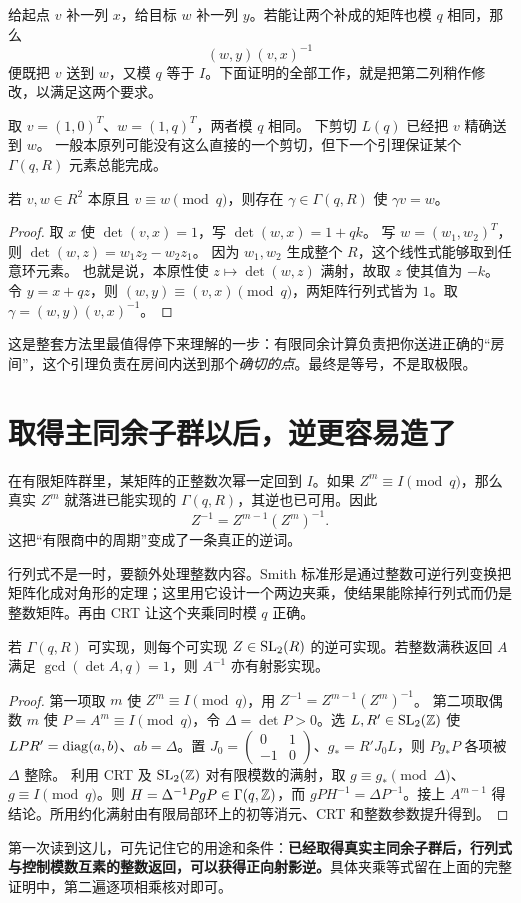 给起点 $v$ 补一列 $x$，给目标 $w$ 补一列 $y$。若能让两个补成的矩阵也模 $q$ 相同，那么
\[(w,y)(v,x)^{-1}
\]
便既把 $v$ 送到 $w$，又模 $q$ 等于 $I$。下面证明的全部工作，就是把第二列稍作修改，以满足这两个要求。
\begin{example}
取 $v=(1,0)^T$、$w=(1,q)^T$，两者模 $q$ 相同。
下剪切 $L(q)$ 已经把 $v$ 精确送到 $w$。
一般本原列可能没有这么直接的一个剪切，但下一个引理保证某个 $\Gamma(q,R)$ 元素总能完成。
\end{example}
\begin{lemma}[相同剩余类中的精确输送]\label{lem:fiber}
若 $v,w\in R^2$ 本原且 $v\equiv w\pmod q$，则存在 $\gamma\in\Gamma(q,R)$ 使 $\gamma v=w$。
\end{lemma}
\begin{proof}
取 $x$ 使 $\det(v,x)=1$，写 $\det(w,x)=1+qk$。
写 $w=(w_1,w_2)^T$，则 $\det(w,z)=w_1z_2-w_2z_1$。
因为 $w_1,w_2$ 生成整个 $R$，这个线性式能够取到任意环元素。
也就是说，本原性使 $z\mapsto\det(w,z)$ 满射，故取 $z$ 使其值为 $-k$。令 $y=x+qz$，则 $(w,y)\equiv(v,x)\pmod q$，两矩阵行列式皆为 $1$。取 $\gamma=(w,y)(v,x)^{-1}$。
\end{proof}
这是整套方法里最值得停下来理解的一步：有限同余计算负责把你送进正确的“房间”，这个引理负责在房间内送到那个\emph{确切的点}。最终是等号，不是取极限。

\section{取得主同余子群以后，逆更容易造了}
在有限矩阵群里，某矩阵的正整数次幂一定回到 $I$。如果 $Z^m\equiv I\pmod q$，那么真实 $Z^m$ 就落进已能实现的 $\Gamma(q,R)$，其逆也已可用。因此
\[Z^{-1}=Z^{m-1}(Z^m)^{-1}.
\]
这把“有限商中的周期”变成了一条真正的逆词。

行列式不是一时，要额外处理整数内容。Smith 标准形是通过整数可逆行列变换把矩阵化成对角形的定理；这里用它设计一个两边夹乘，使结果能除掉行列式而仍是整数矩阵。再由 CRT 让这个夹乘同时模 $q$ 正确。
\begin{lemma}[获得深同余群以后的正向逆]\label{lem:inverse}
若 $\Gamma(q,R)$ 可实现，则每个可实现 $Z\in\operatorname{SL}_2(R)$ 的逆可实现。若整数满秩返回 $A$ 满足 $\gcd(\det A,q)=1$，则 $A^{-1}$ 亦有射影实现。
\end{lemma}
\begin{proof}
第一项取 $m$ 使 $Z^m\equiv I\pmod q$，用 $Z^{-1}=Z^{m-1}(Z^m)^{-1}$。
第二项取偶数 $m$ 使 $P=A^m\equiv I\pmod q$，令 $\Delta=\det P>0$。选 $L,R'\in\operatorname{SL}_2(\mathbb Z)$ 使 $LPR'=\operatorname{diag}(a,b)$、$ab=\Delta$。置 $J_0=\left(\begin{smallmatrix}0&1\\-1&0\end{smallmatrix}\right)$、$g_*=R'J_0L$，则 $Pg_*P$ 各项被 $\Delta$ 整除。
利用 CRT 及 $\operatorname{SL}_2(\mathbb Z)$ 对有限模数的满射，取 $g\equiv g_*\pmod\Delta$、$g\equiv I\pmod q$。则 $H=\Delta^{-1}PgP\in\Gamma(q,\mathbb Z)$，而 $gPH^{-1}=\Delta P^{-1}$。接上 $A^{m-1}$ 得结论。所用约化满射由有限局部环上的初等消元、CRT 和整数参数提升得到。
\end{proof}
第一次读到这儿，可先记住它的用途和条件：\textbf{已经取得真实主同余子群后，行列式与控制模数互素的整数返回，可以获得正向射影逆。}具体夹乘等式留在上面的完整证明中，第二遍逐项相乘核对即可。
